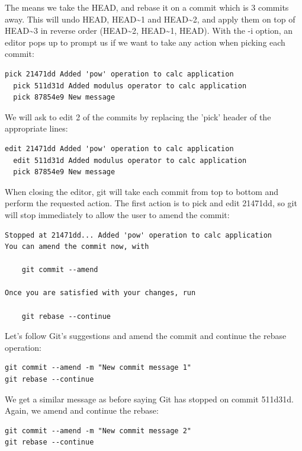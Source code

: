 \documentclass{../../common/tufte-latex/tufte-handout}
\begin{document}
The means we take the HEAD, and rebase it on a commit which is 3 commits away.
This will undo HEAD, HEAD\textasciitilde1 and HEAD\textasciitilde2, and apply them on top of HEAD\textasciitilde3 in reverse order (HEAD\textasciitilde2, HEAD\textasciitilde1, HEAD).
With the -i option, an editor pops up to prompt us if we want to take any action when picking each commit:

\begin{lstlisting}[style=BashInputStyle]
  pick 21471dd Added 'pow' operation to calc application
  pick 511d31d Added modulus operator to calc application
  pick 87854e9 New message
\end{lstlisting}

We will ask to edit 2 of the commits by replacing the 'pick' header of the appropriate lines:

\begin{lstlisting}[style=BashInputStyle]
  edit 21471dd Added 'pow' operation to calc application
  edit 511d31d Added modulus operator to calc application
  pick 87854e9 New message
\end{lstlisting}

When closing the editor, git will take each commit from top to bottom and perform the requested action.
The first action is to pick and edit 21471dd, so git will stop immediately to allow the user to amend the commit:

\begin{lstlisting}[style=BashInputStyle]
Stopped at 21471dd... Added 'pow' operation to calc application
You can amend the commit now, with

	git commit --amend

Once you are satisfied with your changes, run

	git rebase --continue
\end{lstlisting}

Let's follow Git's suggestions and amend the commit and continue the rebase operation:

\begin{lstlisting}[style=BashInputStyle]
git commit --amend -m "New commit message 1"
git rebase --continue
\end{lstlisting}

We get a similar message as before saying Git has stopped on commit 511d31d.
Again, we amend and continue the rebase:

\begin{lstlisting}[style=BashInputStyle]
git commit --amend -m "New commit message 2"
git rebase --continue
\end{lstlisting}
\end{document}
